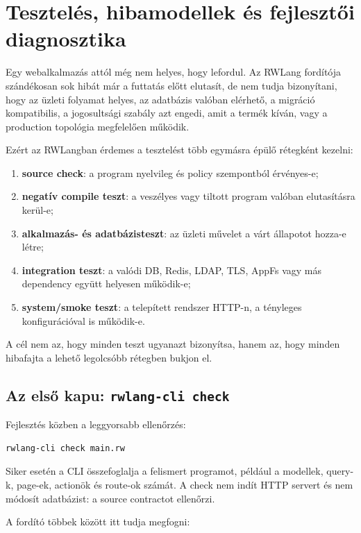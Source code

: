 \chapter{Tesztelés, hibamodellek és fejlesztői diagnosztika}

Egy webalkalmazás attól még nem helyes, hogy lefordul. Az RWLang fordítója szándékosan sok hibát már a futtatás előtt elutasít, de nem tudja bizonyítani, hogy az üzleti folyamat helyes, az adatbázis valóban elérhető, a migráció kompatibilis, a jogosultsági szabály azt engedi, amit a termék kíván, vagy a production topológia megfelelően működik.

Ezért az RWLangban érdemes a tesztelést több egymásra épülő rétegként kezelni:

\begin{enumerate}
  \item \textbf{source check}: a program nyelvileg és policy szempontból érvényes-e;
  \item \textbf{negatív compile teszt}: a veszélyes vagy tiltott program valóban elutasításra kerül-e;
  \item \textbf{alkalmazás- és adatbázisteszt}: az üzleti művelet a várt állapotot hozza-e létre;
  \item \textbf{integration teszt}: a valódi DB, Redis, LDAP, TLS, AppFs vagy más dependency együtt helyesen működik-e;
  \item \textbf{system/smoke teszt}: a telepített rendszer HTTP-n, a tényleges konfigurációval is működik-e.
\end{enumerate}

A cél nem az, hogy minden teszt ugyanazt bizonyítsa, hanem az, hogy minden hibafajta a lehető legolcsóbb rétegben bukjon el.

\section{Az első kapu: \texttt{rwlang-cli check}}

Fejlesztés közben a leggyorsabb ellenőrzés:

\begin{lstlisting}
rwlang-cli check main.rw
\end{lstlisting}

Siker esetén a CLI összefoglalja a felismert programot, például a modellek, query-k, page-ek, actionök és route-ok számát. A check nem indít HTTP servert és nem módosít adatbázist: a source contractot ellenőrzi.

A fordító többek között itt tudja megfogni:

